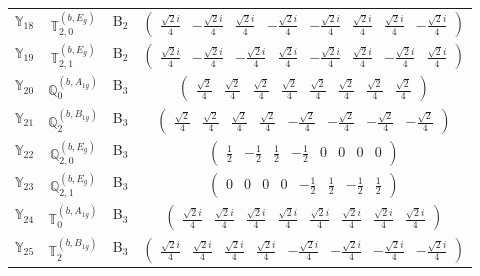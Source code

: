 \documentclass[fleqn,10pt,landscape]{article}
\begin{document}
\begin{itemize}
\begin{center}
\begin{longtable}{c|c|c|c}
$ \mathbb{Y}_{18} $ & $\mathbb{T}_{2,0}^{(b,E_{g})}$ & B$_{2}$ & $\begin{pmatrix} \frac{\sqrt{2} i}{4} & - \frac{\sqrt{2} i}{4} & \frac{\sqrt{2} i}{4} & - \frac{\sqrt{2} i}{4} & - \frac{\sqrt{2} i}{4} & \frac{\sqrt{2} i}{4} & \frac{\sqrt{2} i}{4} & - \frac{\sqrt{2} i}{4} \end{pmatrix}$ \\
$ \mathbb{Y}_{19} $ & $\mathbb{T}_{2,1}^{(b,E_{g})}$ & B$_{2}$ & $\begin{pmatrix} \frac{\sqrt{2} i}{4} & - \frac{\sqrt{2} i}{4} & - \frac{\sqrt{2} i}{4} & \frac{\sqrt{2} i}{4} & - \frac{\sqrt{2} i}{4} & \frac{\sqrt{2} i}{4} & - \frac{\sqrt{2} i}{4} & \frac{\sqrt{2} i}{4} \end{pmatrix}$ \\ \hline
$ \mathbb{Y}_{20} $ & $\mathbb{Q}_{0}^{(b,A_{1g})}$ & B$_{3}$ & $\begin{pmatrix} \frac{\sqrt{2}}{4} & \frac{\sqrt{2}}{4} & \frac{\sqrt{2}}{4} & \frac{\sqrt{2}}{4} & \frac{\sqrt{2}}{4} & \frac{\sqrt{2}}{4} & \frac{\sqrt{2}}{4} & \frac{\sqrt{2}}{4} \end{pmatrix}$ \\
$ \mathbb{Y}_{21} $ & $\mathbb{Q}_{2}^{(b,B_{1g})}$ & B$_{3}$ & $\begin{pmatrix} \frac{\sqrt{2}}{4} & \frac{\sqrt{2}}{4} & \frac{\sqrt{2}}{4} & \frac{\sqrt{2}}{4} & - \frac{\sqrt{2}}{4} & - \frac{\sqrt{2}}{4} & - \frac{\sqrt{2}}{4} & - \frac{\sqrt{2}}{4} \end{pmatrix}$ \\
$ \mathbb{Y}_{22} $ & $\mathbb{Q}_{2,0}^{(b,E_{g})}$ & B$_{3}$ & $\begin{pmatrix} \frac{1}{2} & - \frac{1}{2} & \frac{1}{2} & - \frac{1}{2} & 0 & 0 & 0 & 0 \end{pmatrix}$ \\
$ \mathbb{Y}_{23} $ & $\mathbb{Q}_{2,1}^{(b,E_{g})}$ & B$_{3}$ & $\begin{pmatrix} 0 & 0 & 0 & 0 & - \frac{1}{2} & \frac{1}{2} & - \frac{1}{2} & \frac{1}{2} \end{pmatrix}$ \\
$ \mathbb{Y}_{24} $ & $\mathbb{T}_{0}^{(b,A_{1g})}$ & B$_{3}$ & $\begin{pmatrix} \frac{\sqrt{2} i}{4} & \frac{\sqrt{2} i}{4} & \frac{\sqrt{2} i}{4} & \frac{\sqrt{2} i}{4} & \frac{\sqrt{2} i}{4} & \frac{\sqrt{2} i}{4} & \frac{\sqrt{2} i}{4} & \frac{\sqrt{2} i}{4} \end{pmatrix}$ \\
$ \mathbb{Y}_{25} $ & $\mathbb{T}_{2}^{(b,B_{1g})}$ & B$_{3}$ & $\begin{pmatrix} \frac{\sqrt{2} i}{4} & \frac{\sqrt{2} i}{4} & \frac{\sqrt{2} i}{4} & \frac{\sqrt{2} i}{4} & - \frac{\sqrt{2} i}{4} & - \frac{\sqrt{2} i}{4} & - \frac{\sqrt{2} i}{4} & - \frac{\sqrt{2} i}{4} \end{pmatrix}$ \\

\end{longtable}
\end{center}
\end{itemize}
\end{document}
